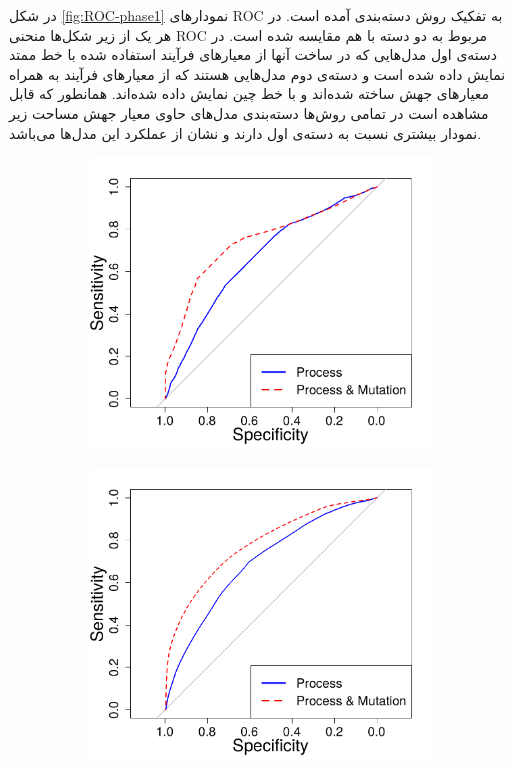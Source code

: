 در شکل \ref{fig:ROC-phase1} نمودارهای ROC به تفکیک روش دسته‌بندی آمده است. در هر یک از زیر شکل‌ها منحنی ROC مربوط به  دو دسته با هم مقایسه شده است. در دسته‌ی اول مدل‌هایی که در ساخت آنها از معیارهای فرآیند استفاده شده  با خط ممتد نمایش داده شده است و دسته‌ی دوم مدل‌هایی هستند که از معیارهای فرآیند به همراه معیارهای جهش ساخته شده‌اند و با خط چین نمایش داده شده‌اند. همانطور که قابل مشاهده است در تمامی روش‌ها دسته‌بندی مدل‌های حاوی معیار جهش مساحت زیر نمودار بیشتری نسبت به دسته‌ی اول دارند و نشان از عملکرد این مدل‌ها می‌باشد. 
\begin{figure}[H]
	\begin{subfigure}{.5\textwidth}
		\centering
		\includegraphics[width=\linewidth]{img/evaluation/phase1-roc-dt.pdf}
		\caption{}
	\end{subfigure}
	\begin{subfigure}{.5\textwidth}
	\centering
	\includegraphics[width=\linewidth]{img/evaluation/phase1-roc-svm.pdf}

\end{subfigure}
\end{figure}
